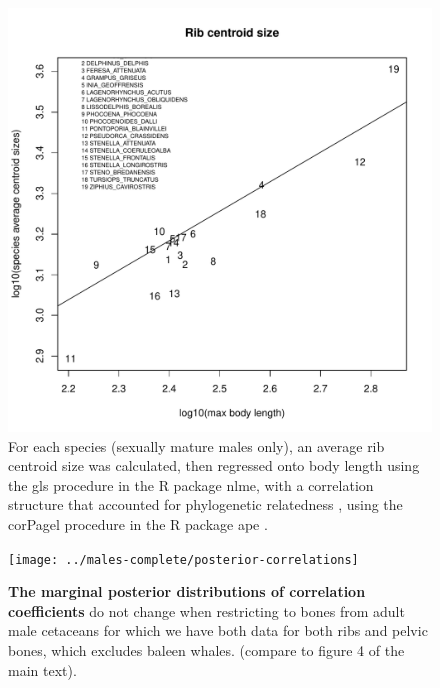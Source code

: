 \documentclass[12pt]{article}
\begin{document}
\begin{figure}
\begin{center}
  \includegraphics[width=\textwidth]{S6}
\end{center}
\caption{
For each species (sexually mature males only), an average rib centroid size was calculated, then regressed onto body length using the gls procedure in the R package nlme, with a correlation structure that accounted for phylogenetic relatedness \citep{pagel1999}, using the corPagel procedure in the R package ape \citep{paradis2004}.
}
\end{figure}

\begin{figure}[ht]
  \begin{center}
    \texttt{[image: ../males-complete/posterior-correlations]}
  \end{center}
  \caption{
  \textbf{The marginal posterior distributions of correlation coefficients} 
  do not change when restricting to bones from adult male cetaceans for which we have both data for both ribs and pelvic bones,
  which excludes baleen whales.  (compare to figure 4 of the main text).
  \label{fig:males_complete_posterior_cors}
  }
\end{figure}
\end{document}
